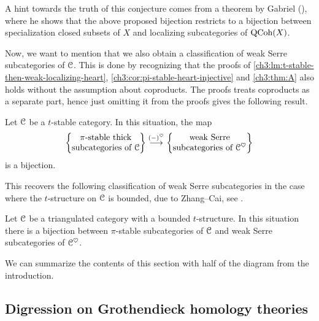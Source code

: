 \begin{remark}
    A hint towards the truth of this conjecture comes from a theorem by Gabriel (\cite[VI.2.4(b)]{gabriel_1962}), where he shows that the above proposed bijection restricts to a bijection between specialization closed subsets of $X$ and localizing subcategories of $\operatorname{QCoh}(X)$. 
\end{remark}

Now, we want to mention that we also obtain a classification of weak Serre subcategories of $\EuScript{C}$. This is done by recognizing that the proofs of \cref{ch3:lm:t-stable-then-weak-localizing-heart}, \cref{ch3:cor:pi-stable-heart-injective} and \cref{ch3:thm:A} also holds without the assumption about coproducts. The proofs treats coproducts as a separate part, hence just omitting it from the proofs gives the following result. 

\begin{proposition}
    \label{ch3:prop:classification-weak-serre}
    Let $\EuScript{C}$ be a $t$-stable category. In this situation, the map 
    \[\left\{ \begin{matrix} \pi\text{-stable thick}\\ \text{subcategories of }\EuScript{C} \end{matrix} \right\}\overset{(-)^\heartsuit}{\longrightarrow} \left\{ \begin{matrix} \text{weak Serre}\\ \text{subcategories of }\EuScript{C}^\heartsuit \end{matrix} \right\}\] 
    is a bijection. 
\end{proposition}

This recovers the following classification of weak Serre subcategories in the case where the $t$-structure on $\EuScript{C}$ is bounded, due to Zhang--Cai, see \cite{zhang-cai_2017}. 

\begin{corollary}
    \label{ch3:cor:classification-weak-serre-bounded}
    Let $\EuScript{C}$ be a triangulated category with a bounded $t$-structure. In this situation there is a bijection between $\pi$-stable subcategories of $\EuScript{C}$ and weak Serre subcategories of $\EuScript{C}^\heartsuit$.  
\end{corollary}

We can summarize the contents of this section with half of the diagram from the introduction. 

\begin{center}
\end{center}

\subsection*{Digression on Grothendieck homology theories}

